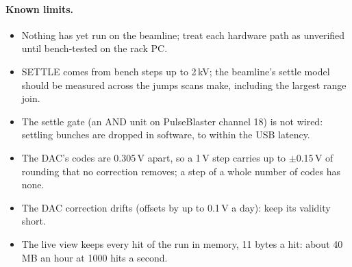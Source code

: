 \paragraph{Known limits.}
\begin{itemize}
    \item Nothing has yet run on the beamline; treat each hardware path as unverified until
        bench-tested on the rack PC.
    \item SETTLE comes from bench steps up to 2\,kV; the beamline's settle model should be
        measured across the jumps scans make, including the largest range join.
    \item The settle gate (an AND unit on PulseBlaster channel 18) is not wired: settling
        bunches are dropped in software, to within the USB latency.
    \item The DAC's codes are 0.305\,V apart, so a 1\,V step carries up to $\pm$0.15\,V of
        rounding that no correction removes; a step of a whole number of codes has none.
    \item The DAC correction drifts (offsets by up to 0.1\,V a day): keep its validity short.
    \item The live view keeps every hit of the run in memory, 11 bytes a hit: about 40\,MB
        an hour at 1000 hits a second.
\end{itemize}
